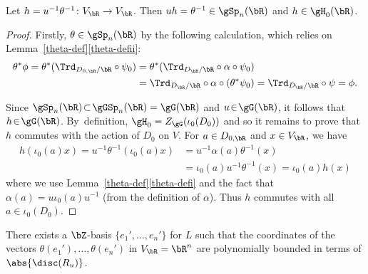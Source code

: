 \begin{lemma} \label{h-in-h0}
Let $h = u^{-1} \theta^{-1} \colon V_\bR \to V_\bR$.
Then $uh = \theta^{-1} \in \gSp_n(\bR)$ and $h \in \gH_0(\bR)$.
\end{lemma}

\begin{proof}
Firstly, $\theta \in \gSp_n(\bR)$ by the following calculation, which relies on Lem\-ma~\ref{theta-def}\eqref{theta-defii}:
\begin{align*}
\theta^* \phi
= \theta^*({\Trd_{D_{0,\bR}/\bR}} \circ \psi_0)
& = \theta^*({\Trd_{D_\bR/\bR}} \circ \alpha \circ \psi_0)
\\& = {\Trd_{D_\bR/\bR}} \circ \alpha \circ (\theta^* \psi_0)
= {\Trd_{D_\bR/\bR}} \circ \psi
= \phi.
\end{align*}

Since $\gSp_n(\bR) \!\subset\! \gGSp_n(\bR) = \gG(\bR)$ and $u \!\in\! \gG(\bR)$, it follows that $h \!\in\! \gG(\bR)$.
By~definition, $\gH_0 = Z_\gG(\iota_0(D_0))$ and so it remains to prove that $h$ commutes with the action of $D_0$ on $V$.
For $a \in D_{0,\bR}$ and $x \in V_\bR$, we have
\begin{align*}
h(\iota_0(a)x)
= u^{-1} \theta^{-1} (\iota_0(a)x)
& = u^{-1} \alpha(a) \theta^{-1}(x)
\\& = \iota_0(a) u^{-1} \theta^{-1}(x)
= \iota_0(a)h(x)
\end{align*}
where we use Lemma~\ref{theta-def}\eqref{theta-defi} and the fact that $\alpha(a) = u\iota_0(a)u^{-1}$ (from the definition of $\alpha$).
Thus $h$ commutes with all $a \in \iota_0(D_0)$.
\end{proof}

\begin{lemma} \label{z-basis-bound}
There exists a $\bZ$-basis $\{ e_1', \dotsc, e_n' \}$ for $L$ such that the coordinates of the vectors $\theta(e_1'), \dotsc, \theta(e_n')$ in $V_\bR = \bR^n$ are polynomially bounded in terms of $\abs{\disc(R_u)}$.
\end{lemma}


